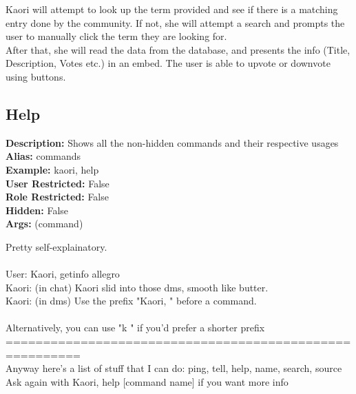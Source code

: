 \documentclass[11pt]{article}
\begin{document}
Kaori will attempt to look up the term provided and see if there is a matching entry done by the community. If not, she will attempt a search and prompts the user to manually click the term they are looking for.
\\
After that, she will read the data from the database, and presents the info (Title, Description, Votes etc.) in an embed. The user is able to upvote or downvote using buttons.

\subsection{Help}
\textbf{Description: } \hspace{5pt} Shows all the non-hidden commands and their respective usages \\
\textbf{Alias: } \hspace{5pt} commands \\
\textbf{Example: } \hspace{5pt} kaori, help \\
\textbf{User Restricted: } \hspace{5pt} False\\
\textbf{Role Restricted: } \hspace{5pt} False\\
\textbf{Hidden: } \hspace{5pt} False\\
\textbf{Args: } \hspace{5pt} (command)

Pretty self-explainatory.
\\ \\
User: Kaori, getinfo allegro
\\ 
Kaori: (in chat) Kaori slid into those dms, smooth like butter.
\\
Kaori: (in dms) Use the prefix "Kaori, " before a command. 
\\ \\
 Alternatively, you can use "k " if you'd prefer a shorter prefix \\
======================================================== \\

 Anyway here's a list of stuff that I can do: ping, tell, help, name, search, source
 \\
 Ask again with Kaori, help [command name] if you want more info
 
\end{document}
